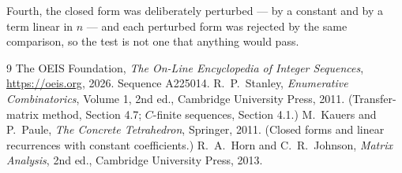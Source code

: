 \documentclass[11pt,a4paper]{article}
\theoremstyle{plain}
\theoremstyle{definition}
\begin{document}
Fourth, the closed form was deliberately perturbed --- by a constant and by a term linear in
$n$ --- and each perturbed form was rejected by the same comparison, so the test is not one
that anything would pass.

\begin{thebibliography}{9}
 The OEIS Foundation, \emph{The On-Line Encyclopedia of Integer
Sequences}, \url{https://oeis.org}, 2026. Sequence A225014.
 R.~P.~Stanley, \emph{Enumerative Combinatorics}, Volume 1, 2nd ed.,
Cambridge University Press, 2011. (Transfer-matrix method, Section 4.7; $C$-finite sequences,
Section 4.1.)
 M.~Kauers and P.~Paule, \emph{The Concrete Tetrahedron}, Springer, 2011.
(Closed forms and linear recurrences with constant coefficients.)
 R.~A.~Horn and C.~R.~Johnson, \emph{Matrix Analysis}, 2nd ed., Cambridge
University Press, 2013.
\end{thebibliography}
\end{document}
